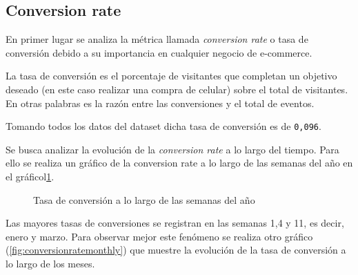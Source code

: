 \documentclass[a4paper]{article}
\begin{document}
\subsection{Conversion rate}

En primer lugar se analiza la métrica llamada \textit{conversion rate} o tasa de conversión debido a su importancia en cualquier negocio de e-commerce.

La tasa de conversión es el porcentaje de visitantes que completan un objetivo deseado (en este caso realizar una compra de celular) sobre el total de visitantes. En otras palabras es la razón entre las conversiones y el total de eventos.

Tomando todos los datos del dataset dicha tasa de conversión es de \texttt{0,096}. 
	
Se busca analizar la evolución de la \textit{conversion rate} a lo largo del tiempo. Para ello se realiza un gráfico de la conversion rate a lo largo de las semanas del año en el gráficol\ref{fig:conversionrate}.

\begin{figure}[h!]
	\caption{Tasa de conversión a lo largo de las semanas del año}
	\label{fig:conversionrate}
\end{figure}

Las mayores tasas de conversiones se registran en las semanas 1,4 y 11, es decir, enero y marzo. Para observar mejor este fenómeno se realiza otro gráfico (\ref{fig:conversionratemonthly}) que muestre la evolución de la tasa de conversión a lo largo de los meses. 
\end{document}
